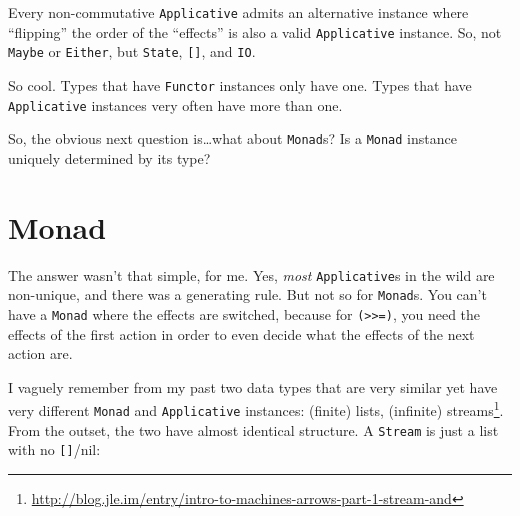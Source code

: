 \documentclass[]{article}
\newenvironment{Shaded}{}{}
\newcommand{\KeywordTok}[1]{\textcolor[rgb]{0.00,0.44,0.13}{\textbf{{#1}}}}
\newcommand{\DataTypeTok}[1]{\textcolor[rgb]{0.56,0.13,0.00}{{#1}}}
\newcommand{\CommentTok}[1]{\textcolor[rgb]{0.38,0.63,0.69}{\textit{{#1}}}}
\newcommand{\OtherTok}[1]{\textcolor[rgb]{0.00,0.44,0.13}{{#1}}}
\newcommand{\FunctionTok}[1]{\textcolor[rgb]{0.02,0.16,0.49}{{#1}}}
\newcommand{\NormalTok}[1]{{#1}}
\renewcommand{\href}[2]{#2\footnote{\url{#1}}}
\begin{document}
Every non-commutative \texttt{Applicative} admits an alternative
instance where ``flipping'' the order of the ``effects'' is also a valid
\texttt{Applicative} instance. So, not \texttt{Maybe} or
\texttt{Either}, but \texttt{State}, \texttt{{[}{]}}, and \texttt{IO}.

\begin{Shaded}
\end{Shaded}

So cool. Types that have \texttt{Functor} instances only have one. Types
that have \texttt{Applicative} instances very often have more than one.

So, the obvious next question is\ldots{}what about \texttt{Monad}s? Is a
\texttt{Monad} instance uniquely determined by its type?

\section{Monad}\label{monad}

The answer wasn't that simple, for me. Yes, \emph{most}
\texttt{Applicative}s in the wild are non-unique, and there was a
generating rule. But not so for \texttt{Monad}s. You can't have a
\texttt{Monad} where the effects are switched, because for
\texttt{(\textgreater{}\textgreater{}=)}, you need the effects of the
first action in order to even decide what the effects of the next action
are.

I vaguely remember from my past two data types that are very similar yet
have very different \texttt{Monad} and \texttt{Applicative} instances:
(finite) lists, (infinite)
\href{http://blog.jle.im/entry/intro-to-machines-arrows-part-1-stream-and}{streams}.
From the outset, the two have almost identical structure. A
\texttt{Stream} is just a list with no \texttt{{[}{]}}/nil:
\end{document}
